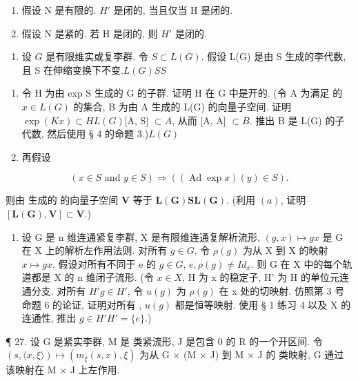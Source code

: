 \begin{enumerate}
\def\labelenumi{(\alph{enumi})}
\item
  假设 N 是有限的. \(H'\) 是闭的, 当且仅当 H 是闭的.
\item
  假设 N 是紧的. 若 H 是闭的, 则 \(H'\) 是闭的.
\end{enumerate}

\begin{enumerate}
\def\labelenumi{\arabic{enumi}.}
\setcounter{enumi}{24}
\tightlist
\item
  设 \(G\) 是有限维实或复李群. 令 \(S \subset L(G)\). 假设 L(G) 是由 S 生成的李代数, 且 S 在伸缩变换下不变.\(L(G)\)\(S\)\(S\)
\end{enumerate}

\begin{enumerate}
\def\labelenumi{(\alph{enumi})}
\item
  令 H 为由 exp S 生成的 G 的子群. 证明 H 在 G 中是开的. (令 A 为满足  的 \(x \in L(G)\) 的集合, B 为由 A 生成的 L(G) 的向量子空间. 证明 \(\exp(Kx) \subset H\)\(L(G)\){[}A, S{]} \(\subset A\), 从而 {[}A, A{]} \(\subset B\). 推出 B 是 L(G) 的子代数, 然后使用 § 4 的命题 3.)\(L(G)\)
\item
  再假设
\end{enumerate}

\[
(x \in S \text {   and   } y \in S) \Rightarrow ((\operatorname{Ad} \exp x) (y) \in S).
\]

则由  生成的  的向量子空间 \(\mathbf{V}\) 等于 \(\mathbf{L}(\mathbf{G})\)\(\mathbf{S}\)\(\mathbf{L}(\mathbf{G})\). (利用 \((a)\), 证明 \([\mathbf{L}(\mathbf{G}), \mathbf{V}] \subset \mathbf{V}\).)

\begin{enumerate}
\def\labelenumi{\arabic{enumi}.}
\setcounter{enumi}{25}
\tightlist
\item
  设 G 是 n 维连通紧复李群, X 是有限维连通复解析流形, \((g, x) \mapsto gx\) 是 G 在 X 上的解析左作用法则. 对所有 \(g \in G\), 令 \(\rho(g)\) 为从 X 到 X 的映射 \(x \mapsto gx\). 假设对所有不同于 e 的 \(g \in G\), \(e, \rho(g) \neq Id_x\). 则 G 在 X 中的每个轨道都是 X 的 n 维闭子流形. (令 \(x \in X\), H 为 x 的稳定子, H' 为 H 的单位元连通分支. 对所有 \(H'\)\(g \in H'\), 令 \(u(g)\) 为 \(\rho(g)\) 在 x 处的切映射. 仿照第 3 号命题 6 的论证, 证明对所有 , \(u(g)\) 都是恒等映射. 使用 § 1 练习 4 以及 X 的连通性, 推出 \(g \in H'\)\(H' = \{e\}\).)
\end{enumerate}

¶ 27. 设 G 是紧实李群, M 是  类紧流形, J 是包含 0 的 R 的一个开区间. 令 \((s, \langle x, \xi \rangle) \mapsto (m_{\xi}(s, x), \xi)\) 为从 G × (M × J) 到 M × J 的  类映射, G 通过该映射在 M × J 上左作用.

